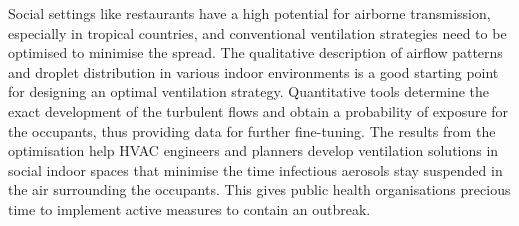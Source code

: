 \documentclass[preprint,12pt]{elsarticle}
\begin{document}
Social settings like restaurants have a high potential for airborne transmission, especially in tropical countries, and conventional ventilation strategies need to be optimised to minimise the spread. The qualitative description of airflow patterns and droplet distribution in various indoor environments is a good starting point for designing an optimal ventilation strategy. Quantitative tools determine the exact development of the turbulent flows and obtain a probability of exposure for the occupants, thus providing data for further fine-tuning. The results from the optimisation help HVAC engineers and planners develop ventilation solutions in social indoor spaces that minimise the time infectious aerosols stay suspended in the air surrounding the occupants. This gives public health organisations precious time to implement active measures to contain an outbreak.


  
 





\end{document}
